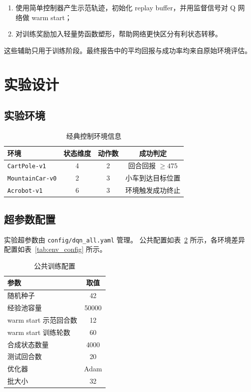 \documentclass[UTF8,a4paper,12pt]{ctexart}
\begin{document}
\begin{enumerate}
    \item 使用简单控制器产生示范轨迹，初始化 replay buffer，并用监督信号对 Q 网络做 warm start；
    \item 对训练奖励加入轻量势函数塑形，帮助网络更快区分有利状态转移。
\end{enumerate}

这些辅助只用于训练阶段。最终报告中的平均回报与成功率均来自原始环境评估。

\section{实验设计}

\subsection{实验环境}

\begin{table}[H]
\centering
\caption{经典控制环境信息}
\label{tab:envs}
\begin{tabular}{lccc}
\toprule
环境 & 状态维度 & 动作数 & 成功判定 \\
\midrule
\texttt{CartPole-v1} & 4 & 2 & 回合回报 $\geq 475$ \\
\texttt{MountainCar-v0} & 2 & 3 & 小车到达目标位置 \\
\texttt{Acrobot-v1} & 6 & 3 & 环境触发成功终止 \\
\bottomrule
\end{tabular}
\end{table}

\subsection{超参数配置}

实验超参数由 \texttt{config/dqn\_all.yaml} 管理。
公共配置如表~\ref{tab:common_config} 所示，各环境差异配置如表~\ref{tab:env_config} 所示。

\begin{table}[H]
\centering
\caption{公共训练配置}
\label{tab:common_config}
\begin{tabular}{lc}
\toprule
参数 & 取值 \\
\midrule
随机种子 & 42 \\
经验池容量 & 50000 \\
warm start 示范回合数 & 12 \\
warm start 训练轮数 & 60 \\
合成状态数量 & 4000 \\
测试回合数 & 20 \\
优化器 & Adam \\
批大小 & 32 \\
\bottomrule
\end{tabular}
\end{table}
\end{document}
